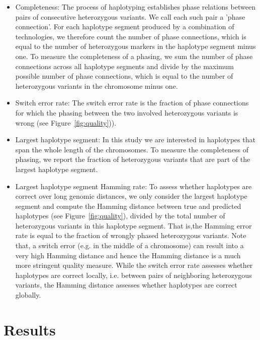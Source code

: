 \begin{itemize}
 \item Completeness: The process of haplotyping establishes phase relations between pairs of consecutive heterozygous variants. We call each such pair a 'phase connection'. For each haplotype segment produced by a combination of technologies, we therefore count the number of phase connections, which is equal to the number of heterozygous markers in the haplotype segment minus one. 
To measure the completeness of a phasing, we sum the number of phase connections across all haplotype segments and divide by the maximum possible number of phase connections, which is equal to the number of heterozygous variants in the chromosome minus one.
\item Switch error rate: The switch error rate is the fraction of phase connections for which the phasing between the two involved heterozygous variants is wrong (see Figure~\ref{fig:quality})).
\item Largest haplotype segment: In this study we are interested in haplotypes that span the whole length of the chromosomes. To measure the completeness of phasing, we report the fraction of heterozygous variants that are part of the largest haplotype segment.
\item Largest haplotype segment Hamming rate: To assess whether haplotypes are correct over long genomic distances, we only consider the largest haplotype segment and compute the Hamming distance between true and predicted haplotypes (see Figure~\ref{fig:quality}),
divided by the total number of heterozygous variants in this haplotype segment. 
That is,the Hamming error rate is equal to the fraction of wrongly phased heterozygous variants. 
Note that, a switch error (e.g. in the middle of a chromosome) can result  into a very high Hamming distance and hence the Hamming distance is a much more stringent quality measure. 
While the switch error rate assesses whether haplotypes are correct locally, i.e. between pairs of neighboring heterozygous variants, the Hamming distance assesses whether haplotypes are correct globally.
\end{itemize}

\section{Results}
